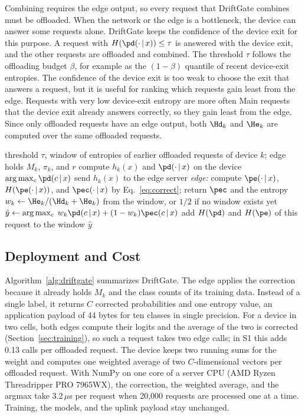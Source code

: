 Combining requires the edge output, so every request that DriftGate combines must be offloaded. When the network or the edge is a bottleneck, the device can answer some requests alone. DriftGate keeps the confidence of the device exit for this purpose. A request with $H(\pd(\cdot\,|\,x))\le\tau$ is answered with the device exit, and the other requests are offloaded and combined. The threshold $\tau$ follows the offloading budget $\beta$, for example as the $(1-\beta)$ quantile of recent device-exit entropies. The confidence of the device exit is too weak to choose the exit that answers a request, but it is useful for ranking which requests gain least from the edge. Requests with very low device-exit entropy are more often Main requests that the device exit already answers correctly, so they gain least from the edge. Since only offloaded requests have an edge output, both $\Hd_k$ and $\He_k$ are computed over the same offloaded requests.

\begin{algorithm}[t]
\caption{DriftGate inference for a request $x$ of device $k$}
\label{alg:driftgate}
\begin{algorithmic}[1]
\REQUIRE threshold $\tau$, window of entropies of earlier offloaded requests of device $k$; edge holds $M_k$, $\pi_k$, and $r$
\STATE compute $h_k(x)$ and $\pd(\cdot\,|\,x)$ on the device
  \RETURN $\arg\max_c \pd(c\,|\,x)$
\ENDIF
\STATE send $h_k(x)$ to the edge server
\STATE \textit{edge:} compute $\pe(\cdot\,|\,x)$, $H(\pe(\cdot\,|\,x))$, and $\pec(\cdot\,|\,x)$ by Eq.~\eqref{eq:correct}; return $\pec$ and the entropy
\STATE $w_k\leftarrow \He_k/(\Hd_k+\He_k)$ from the window, or $1/2$ if no window exists yet
\STATE $\hat y\leftarrow\arg\max_c\; w_k\pd(c\,|\,x)+(1-w_k)\pec(c\,|\,x)$
\STATE add $H(\pd)$ and $H(\pe)$ of this request to the window
\RETURN $\hat y$
\end{algorithmic}
\end{algorithm}

\subsection{Deployment and Cost}
\label{sec:cost}

Algorithm~\ref{alg:driftgate} summarizes DriftGate. The edge applies the correction because it already holds $M_k$ and the class counts of its training data. Instead of a single label, it returns $C$ corrected probabilities and one entropy value, an application payload of 44 bytes for ten classes in single precision. For a device in two cells, both edges compute their logits and the average of the two is corrected (Section~\ref{sec:training}), so such a request takes two edge calls; in S1 this adds 0.13 calls per offloaded request. The device keeps two running sums for the weight and computes one weighted average of two $C$-dimensional vectors per offloaded request. With NumPy on one core of a server CPU (AMD Ryzen Threadripper PRO 7965WX), the correction, the weighted average, and the argmax take 3.2\,$\mu$s per request when 20,000 requests are processed one at a time. Training, the models, and the uplink payload stay unchanged.
